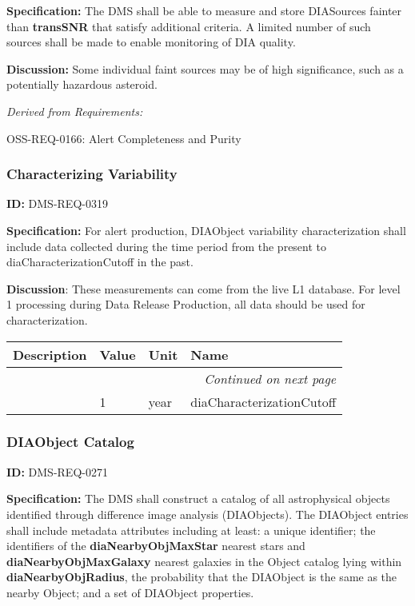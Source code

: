\documentclass[SE,toc,lsstdraft]{lsstdoc}
\makeatletter
\newcommand{\paramname}[1]{\hspace{0pt}#1}
\newcommand{\unitname}[1]{\hspace{0pt}#1}
\newenvironment{parameters}[0]{%
\setlength\LTleft{0pt}
\setlength\LTright{\fill}
\begin{small}
\begin{longtable}[]{|p{0.5\textwidth}|l|p{0.6in}|p{1.74in}@{}|}

\hline \textbf{Description} & \textbf{Value} & \textbf{Unit} & \textbf{Name} \\ \hline
\endhead

\hline \multicolumn{4}{r}{\emph{Continued on next page}} \\
\endfoot

\hline\hline
\endlastfoot
}{%
\hline
\end{longtable}
\end{small}
}
\makeatother
\begin{document}
\textbf{Specification:} The DMS shall be able to measure and store DIASources fainter than \textbf{transSNR }that satisfy additional criteria. A limited number of such sources shall be made to enable monitoring of DIA quality.

\textbf{Discussion: }Some individual faint sources may be of high significance, such as a potentially hazardous asteroid.




\emph{Derived from Requirements:}

OSS-REQ-0166:
Alert Completeness and Purity \newline


\subsubsection{Characterizing Variability}

\label{DMS-REQ-0319}
\textbf{ID:} DMS-REQ-0319

\textbf{Specification:} For alert production, DIAObject variability characterization shall include data collected during the time period from the present to diaCharacterizationCutoff in the past.

\textbf{Discussion}: These measurements can come from the live L1 database. For level 1 processing during Data Release Production, all data should be used for characterization.



\begin{parameters}

&
1
&
\unitname{%
year
}
&
\paramname{%
diaCharacterizationCutoff
} \\\hline
\end{parameters}




\subsubsection{DIAObject Catalog}

\label{DMS-REQ-0271}
\textbf{ID:} DMS-REQ-0271

\textbf{Specification:} The DMS shall construct a catalog of all astrophysical objects identified through difference image analysis (DIAObjects). The DIAObject entries shall include metadata attributes including at least: a unique identifier; the identifiers of the\textbf{ diaNearbyObjMaxStar} nearest stars and \textbf{diaNearbyObjMaxGalaxy} nearest galaxies in the Object catalog lying within \textbf{diaNearbyObjRadius}, the probability that the DIAObject is the same as the nearby Object; and a set of DIAObject properties.
\end{document}
